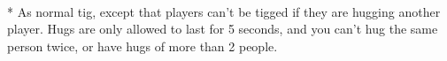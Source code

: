\begin{minipage}{\textwidth}
\\*
As normal tig, except that players can't be tigged if they are hugging another player.  Hugs are only allowed to last for 5 seconds, and you can't hug the same person twice, or have hugs of more than 2 people.
\end{minipage}    \vfill
